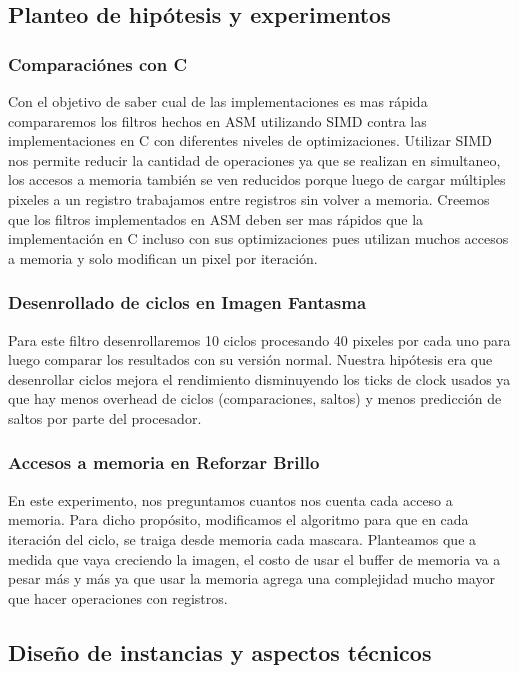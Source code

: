 \documentclass[a4paper]{article}
\begin{document}
\subsection{Planteo de hipótesis y experimentos}

\subsubsection{Comparaci\'ones con C}

Con el objetivo de saber cual de las implementaciones es mas r\'apida compararemos los filtros hechos en ASM utilizando SIMD contra las implementaciones en C con diferentes niveles de optimizaciones. Utilizar SIMD nos permite reducir la cantidad de operaciones ya que se realizan en simultaneo, los accesos a memoria también se ven reducidos porque luego de cargar múltiples pixeles a un registro trabajamos entre registros sin volver a memoria. Creemos que los filtros implementados en ASM deben ser mas r\'apidos que la implementaci\'on en C incluso con sus optimizaciones pues utilizan muchos accesos a memoria y solo modifican un pixel por iteraci\'on.

\subsubsection{Desenrollado de ciclos en Imagen Fantasma}

Para este filtro desenrollaremos 10 ciclos procesando 40 pixeles por cada uno para luego comparar los resultados con su versi\'on normal. Nuestra hipótesis era que desenrollar ciclos mejora el rendimiento disminuyendo los ticks de clock usados ya que hay menos overhead de ciclos (comparaciones, saltos) y menos predicci\'on de saltos por parte del procesador.

\subsubsection{Accesos a memoria en Reforzar Brillo}

En este experimento, nos preguntamos cuantos nos cuenta cada acceso a memoria. Para dicho propósito, modificamos el algoritmo para que en cada iteración del ciclo, se traiga desde memoria cada mascara. Planteamos que a medida que vaya creciendo la imagen, el costo de usar el buffer de memoria va a pesar m\'as y m\'as ya que usar la memoria agrega una complejidad mucho mayor que hacer operaciones con registros. 

\subsection{Dise\~no de instancias y aspectos t\'ecnicos}
\end{document}
